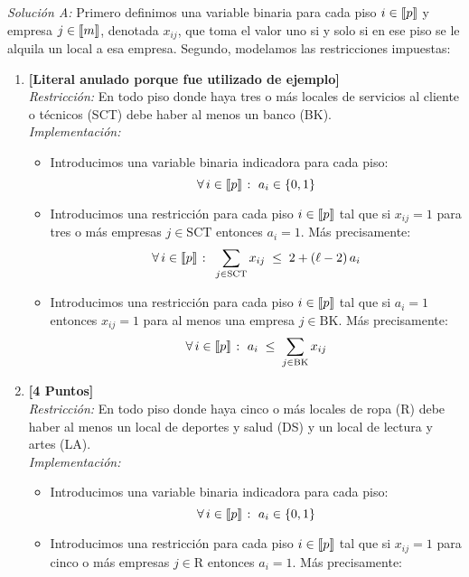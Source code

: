 \documentclass[ a4paper, twoside, 11pt]{article}
\begin{document}
\begin{problem}
\emph{Soluci\'on A:} Primero definimos una variable binaria para cada piso $i \in \llbracket p \rrbracket$ y empresa $j \in \llbracket m \rrbracket$, denotada $x_{ij}$, que toma el valor uno si y solo si en ese piso se le alquila un local a esa empresa. Segundo, modelamos las restricciones impuestas: 
\begin{enumerate}[label=\textbf{\alph*)}]
\item \textbf{[Literal anulado porque fue utilizado de ejemplo]} \\[1ex]
\emph{Restricci\'on:} En todo piso donde haya tres o m\'as locales de servicios al cliente o t\'ecnicos (SCT) debe haber al menos un banco (BK). \\[1ex]
\emph{Implementaci\'on:}
\begin{itemize}
\item Introducimos una variable binaria indicadora para cada piso: 
\[
\forall \, i \in \llbracket p \rrbracket \; \colon \; a_i \in \{ 0, 1 \}
\]
\item Introducimos una restricci\'on para cada piso $i \in \llbracket p \rrbracket$ tal que si $x_{ij} = 1$ para tres o m\'as empresas $j \in \text{SCT}$ entonces $a_i = 1$. M\'as precisamente: 
\[
\forall \, i \in \llbracket p \rrbracket \; \colon \;
\sum_{ j \in \text{SCT} } x_{ij} \; \leq \; 2 + (\ell - 2) \, a_i
\]
\item Introducimos una restricci\'on para cada piso $i \in \llbracket p \rrbracket$ tal que si $a_i = 1$ entonces $x_{ij} = 1$ para al menos una empresa $j \in \text{BK}$. M\'as precisamente: 
\[
\forall \, i \in \llbracket p \rrbracket \; \colon \;
a_i \; \leq \; \sum_{j \in \text{BK}} x_{ij}
\]
\end{itemize}
\item \textbf{[4 Puntos]} \\[1ex]
\emph{Restricci\'on:} En todo piso donde haya cinco o m\'as locales de ropa (R) debe haber al menos un local de deportes y salud (DS) y un local de lectura y artes (LA). \\[1ex]
\emph{Implementaci\'on:}
\begin{itemize}
\item Introducimos una variable binaria indicadora para cada piso: 
\[
\forall \, i \in \llbracket p \rrbracket \; \colon \; a_i \in \{ 0, 1 \}
\]
\item Introducimos una restricci\'on para cada piso $i \in \llbracket p \rrbracket$ tal que si $x_{ij} = 1$ para cinco o m\'as empresas $j \in \text{R}$ entonces $a_i = 1$. M\'as precisamente: 

\end{itemize}
\end{enumerate}
\end{problem}
\end{document}
